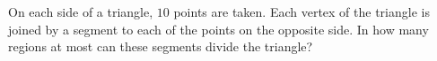 \problem
On each side of a triangle, $10$ points are taken.
Each vertex of the triangle is joined by a segment to each of the points on the
opposite side.
In how many regions at most can these segments divide the triangle?
\solution
\endproblem
